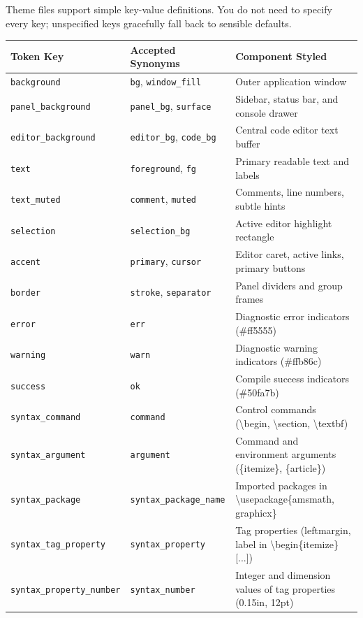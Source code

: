 \documentclass[11pt, a4paper]{article}
\begin{document}
Theme files support simple key-value definitions. You do not need to specify every key; unspecified keys gracefully fall back to sensible defaults.

\begin{table}[htbp]
\centering
\begin{tabular}{lll}
\toprule
\textbf{Token Key} & \textbf{Accepted Synonyms} & \textbf{Component Styled} \\
\midrule
\texttt{background} & \texttt{bg}, \texttt{window\_fill} & Outer application window \\
\texttt{panel\_background} & \texttt{panel\_bg}, \texttt{surface} & Sidebar, status bar, and console drawer \\
\texttt{editor\_background} & \texttt{editor\_bg}, \texttt{code\_bg} & Central code editor text buffer \\
\texttt{text} & \texttt{foreground}, \texttt{fg} & Primary readable text and labels \\
\texttt{text\_muted} & \texttt{comment}, \texttt{muted} & Comments, line numbers, subtle hints \\
\texttt{selection} & \texttt{selection\_bg} & Active editor highlight rectangle \\
\texttt{accent} & \texttt{primary}, \texttt{cursor} & Editor caret, active links, primary buttons \\
\texttt{border} & \texttt{stroke}, \texttt{separator} & Panel dividers and group frames \\
\texttt{error} & \texttt{err} & Diagnostic error indicators (\#ff5555) \\
\texttt{warning} & \texttt{warn} & Diagnostic warning indicators (\#ffb86c) \\
\texttt{success} & \texttt{ok} & Compile success indicators (\#50fa7b) \\
\midrule
\texttt{syntax\_command} & \texttt{command} & Control commands (\textbackslash begin, \textbackslash section, \textbackslash textbf) \\
\texttt{syntax\_argument} & \texttt{argument} & Command and environment arguments (\{itemize\}, \{article\}) \\
\texttt{syntax\_package} & \texttt{syntax\_package\_name} & Imported packages in \textbackslash usepackage\{amsmath, graphicx\} \\
\texttt{syntax\_tag\_property} & \texttt{syntax\_property} & Tag properties (leftmargin, label in \textbackslash begin\{itemize\}[...]) \\
\texttt{syntax\_property\_number} & \texttt{syntax\_number} & Integer and dimension values of tag properties (0.15in, 12pt) \\

\end{tabular}
\end{table}
\end{document}
